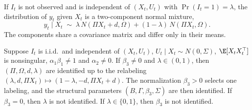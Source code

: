 If $I_t$ is not observed and is independent of $(X_t, U_t)$ with $\Pr(I_t = 1) = \lambda$, the distribution of $y_t$
given $X_t$ is a two-component normal mixture,
\begin{equation}\label{eq:13-mixture-rf}
  y_t \mid X_t \;\sim\; \lambda\, N(\Pi X_t + d, \Omega) + (1 - \lambda)\, N(\Pi X_t, \Omega).
\end{equation}
The components share a covariance matrix and differ only in their means.

\begin{proposition}\label{prop:13-switch-id}
Suppose $I_t$ is i.i.d.\ and independent of $(X_t, U_t)$, $U_t \mid X_t \sim N(0,\Sigma)$, $\E[X_tX_t^\top]$ is nonsingular,
$\alpha_1\beta_1 \ne 1$ and $\alpha_2 \ne 0$. If $\beta_3 \ne 0$ and $\lambda \in (0,1)$, then
$(\Pi, \Omega, d, \lambda)$ are identified up to the relabeling
$(\lambda, d, \Pi X_t) \mapsto (1 - \lambda, -d, \Pi X_t + d)$. The normalization $\beta_3 > 0$ selects one
labeling, and the structural parameters $(B, \Gamma, \beta_3, \Sigma)$ are then identified. If $\beta_3 = 0$, then
$\lambda$ is not identified. If $\lambda \in \{0, 1\}$, then $\beta_3$ is not identified.
\end{proposition}

